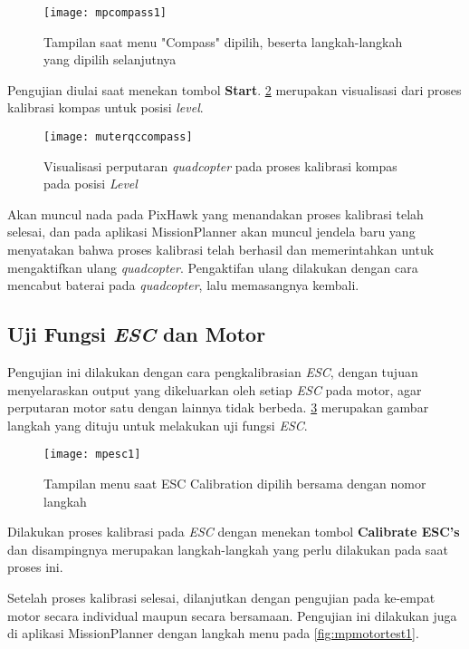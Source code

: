 \begin{figure}[H]
	\centering
	\texttt{[image: mpcompass1]}
	\caption{Tampilan saat menu "Compass" dipilih, beserta langkah-langkah yang dipilih selanjutnya}
	\label{fig:mpcompass1}
\end{figure}

Pengujian diulai saat menekan tombol \textbf{Start}. \cref{fig:muterqccompass} merupakan visualisasi dari proses kalibrasi kompas untuk posisi \textit{level}.

\begin{figure}[H]
	\centering
	\texttt{[image: muterqccompass]}
	\caption{Visualisasi perputaran \textit{quadcopter} pada proses kalibrasi kompas pada posisi \textit{Level}}
	\label{fig:muterqccompass}
\end{figure}

Akan muncul nada pada PixHawk yang menandakan proses kalibrasi telah selesai, dan pada aplikasi MissionPlanner akan muncul jendela baru yang menyatakan bahwa proses kalibrasi telah berhasil dan memerintahkan untuk mengaktifkan ulang \textit{quadcopter}. Pengaktifan ulang dilakukan dengan cara mencabut baterai pada \textit{quadcopter}, lalu memasangnya kembali.

\subsection{Uji Fungsi \textit{ESC} dan Motor}
Pengujian ini dilakukan dengan cara pengkalibrasian \textit{ESC}, dengan tujuan menyelaraskan output yang dikeluarkan oleh setiap \textit{ESC} pada motor, agar perputaran motor satu dengan lainnya tidak berbeda. \cref{fig:mpesc1} merupakan gambar langkah yang dituju untuk melakukan uji fungsi \textit{ESC}.

\begin{figure}[H]
	\centering
	\texttt{[image: mpesc1]}
	\caption{Tampilan menu saat ESC Calibration dipilih bersama dengan nomor langkah}
	\label{fig:mpesc1}
\end{figure}

Dilakukan proses kalibrasi pada \textit{ESC} dengan menekan tombol \textbf{Calibrate ESC's} dan disampingnya merupakan langkah-langkah yang perlu dilakukan pada saat proses ini.

Setelah proses kalibrasi selesai, dilanjutkan dengan pengujian pada ke-empat motor secara individual maupun secara bersamaan. Pengujian ini dilakukan juga di aplikasi MissionPlanner dengan langkah menu pada \cref{fig:mpmotortest1}.

